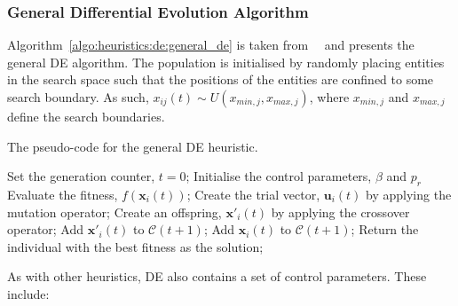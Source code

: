 \subsubsection{General Differential Evolution Algorithm}

Algorithm~\ref{algo:heuristics:de:general_de} is taken from~\citeauthor{ref:engelbrecht:2007}~\cite{ref:engelbrecht:2007} and presents the general \acs{DE} algorithm. The population is initialised by randomly placing entities in the search space such that the positions of the entities are confined to some search boundary. As such, $x_{ij}(t) \sim U(x_{min,j}, x_{max,j})$, where $x_{min,j}$ and $x_{max,j}$ define the search boundaries.

\begin{algorithm}[htbp]
      \caption{The pseudo-code for the general \acs{DE} heuristic.}
      \label{algo:heuristics:de:general_de}
      \begin{algorithmic}
            \State Set the generation counter, $t = 0$;
            \State Initialise the control parameters, $\beta$ and $p_{r}$
            \State Evaluate the fitness, $f(\boldsymbol{x}_{i}(t))$;
            \State Create the trial vector, $\boldsymbol{u}_{i}(t)$ by applying the mutation operator;
            \State Create an offspring, $\boldsymbol{x}'_{i}(t)$ by applying the crossover operator;
            \State Add $\boldsymbol{x}'_{i}(t)$ to $\mathcal{C}(t+1)$;
            \Else
            \State Add $\boldsymbol{x}_{i}(t)$ to $\mathcal{C}(t+1)$;
            \EndIf
            \EndFor
            \EndWhile
            \State Return the individual with the best fitness as the solution;
      \end{algorithmic}
\end{algorithm}

As with other heuristics, \acs{DE} also contains a set of control parameters. These include:

